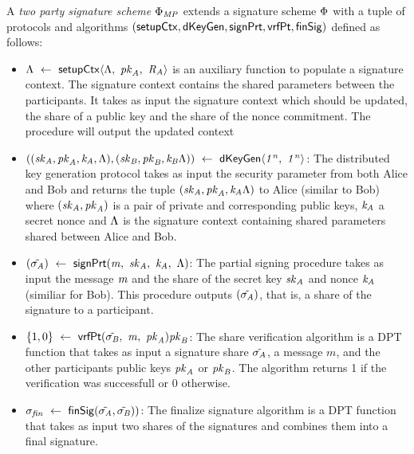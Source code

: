 \begin{definition}
    \label{def:twoPartySig}

    A \emph{two party signature scheme $\Phi_{\mathit{MP}}$} extends a signature scheme $\Phi$ with a tuple of protocols and algorithms
    $(\mathsf{setupCtx}, \mathsf{dKeyGen}, \mathsf{signPrt} , \mathsf{vrfPt}, \mathsf{finSig})$ defined as follows:

    \begin{itemize}
        \item $\Lambda ~\leftarrow~ \mathsf{setupCtx}\langle \Lambda ,~ \mathit{pk}_{\mathit{A}} ,~ \mathit{R}_{\mathit{A}} \rangle$ is an auxiliary function to populate a signature context. The signature context contains the shared
        parameters between the participants. It takes as input the signature context which should be updated, the share of a public key and the share of the nonce commitment.
        The procedure will output the updated context

        \item $((\mathit{sk}_{\mathit{A}}, \mathit{pk}_{\mathit{A}}, \mathit{\mathit{k}_{\mathit{A}}}, \Lambda), (\mathit{sk}_{\mathit{B}}, \mathit{pk}_{\mathit{B}}, \mathit{\mathit{k}_{\mathit{B}}} \Lambda)) ~\leftarrow~ \mathsf{dKeyGen}\langle \mathit{1^n} ,~ \mathit{1^n} \rangle$: The distributed key generation protocol takes as input the security parameter from both Alice and Bob and returns
        the tuple $(\mathit{sk}_{\mathit{A}}, \mathit{pk}_{\mathit{A}}, \mathit{\mathit{k}_{\mathit{A}}} \Lambda)$ to Alice (similar to Bob) where $(\mathit{sk}_{\mathit{A}}, \mathit{pk}_{\mathit{A}})$ is a pair of private and corresponding public keys, $\mathit{\mathit{k}_{\mathit{A}}}$ a secret nonce and $\Lambda$ is the signature context containing shared parameters shared between Alice and Bob.

        \item $(\tilde{\sigma_{\mathit{A}}}) ~\leftarrow~ \mathsf{signPrt}(\mathit{m} ,~ \mathit{sk}_{\mathit{A}} ,~ \mathit{\mathit{k}_{\mathit{A}}} ,~ \Lambda)$: The partial signing procedure takes as input the message $\mathit{m}$ and the share of the secret key $\mathit{sk}_{\mathit{A}}$ and nonce $\mathit{\mathit{k}_{\mathit{A}}}$ (similiar for Bob). This procedure outputs $(\tilde{\sigma_{\mathit{A}}})$, that is, a share of the signature to a participant.

        \item $\{1,0\} ~\leftarrow~ \mathsf{vrfPt}(\tilde{\sigma_{\mathit{B}}} ,~ \mathit{m} ,~ \mathit{pk}_{\mathit{A}}){\mathit{pk}_{\mathit{B}}}$: The share verification algorithm is a DPT function that takes as input a signature share $\tilde{\sigma_{\mathit{A}}}$, a message $m$, and the other participants public keys $\mathit{pk}_{\mathit{A}}$ or $\mathit{pk}_{\mathit{B}}$. The algorithm returns 1 if the verification was successfull or 0 otherwise.

        \item $\sigma_{\mathit{fin}} ~\leftarrow~ \mathsf{finSig}(\tilde{\sigma_{\mathit{A}}},\tilde{\sigma_{\mathit{B}}}))$: The finalize signature algorithm is a DPT function that takes as input two shares of the signatures and combines them into a final signature.

    \end{itemize}

\end{definition}

